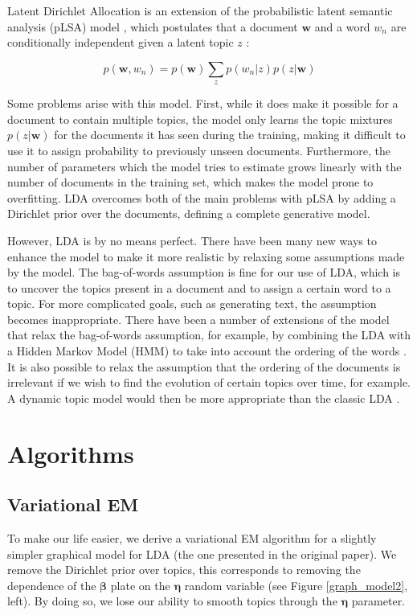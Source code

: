 \documentclass{article}
\begin{document}
Latent Dirichlet Allocation is an extension of the probabilistic latent semantic analysis (pLSA) model \cite{hofmann1999probabilistic}, which postulates that a document $\mathbf{w}$ and a word $w_{n}$ are conditionally independent given a latent topic $z$ :

\begin{equation*}
p(\mathbf{w},w_{n}) = p(\mathbf{w}) \sum_z p(w_n|z)p(z|\mathbf{w})
\end{equation*}

Some problems arise with this model. First, while it does make it possible for a document to contain multiple topics, the model only learns the topic mixtures $p(z|\mathbf{w})$ for the documents it has seen during the training, making it difficult to use it to assign probability to previously unseen documents. Furthermore, the number of parameters which the model tries to estimate grows linearly with the number of documents in the training set, which makes the model prone to overfitting. LDA overcomes both of the main problems with pLSA by adding a Dirichlet prior over the documents, defining a complete generative model.

However, LDA is by no means perfect. There have been many new ways to enhance the model to make it more realistic by relaxing some assumptions made by the model. The bag-of-words assumption is fine for our use of LDA, which is to uncover the topics present in a document and to assign a certain word to a topic. For more complicated goals, such as generating text, the assumption becomes inappropriate. There have been a number of extensions of the model that relax the bag-of-words assumption, for example, by combining the LDA with a Hidden Markov Model (HMM) to take into account the ordering of the words \cite{griffiths2005integrating}. It is also possible to relax the assumption that the ordering of the documents is irrelevant if we wish to find the evolution of certain topics over time, for example. A dynamic topic model would then be more appropriate than the classic LDA \cite{blei2006dynamic}.

\section{Algorithms}

\subsection{Variational EM}
To make our life easier, we derive a variational EM algorithm for a slightly simpler graphical model for LDA (the one presented in the original paper). We remove the Dirichlet prior over topics, this corresponds to removing the dependence of the $\bm{\beta}$ plate on the $\bm{\eta}$ random variable (see Figure \ref{graph_model2}, left). By doing so, we lose our ability to smooth topics through the $\bm{\eta}$ parameter.
\end{document}

